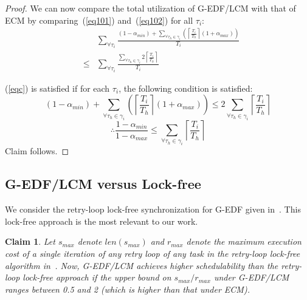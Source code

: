 \documentclass[a4paper,english]{article}
\newtheorem{clm}{Claim}
\newtheorem{proof}{Proof}
\begin{document}
\begin{proof}
We can now compare the total utilization of G-EDF/LCM with that of ECM by comparing~(\ref{eq101}) and~(\ref{eq102}) for all $\tau_i$:
\begin{eqnarray}
& & \sum_{\forall \tau_{i}}\frac{(1-\alpha_{min})+\sum_{\forall \tau_{h}\in\gamma_{i}}\left(\left\lceil\frac{T_{i}}{T_{h}}\right\rceil(1+\alpha_{max})\right)}{T_{i}} \nonumber\\
& \le &   \sum_{\forall \tau_{i}}\frac{\sum_{\forall \tau_{h}\in\gamma_{i}}2\left\lceil\frac{T_{i}}{T_{h}}\right\rceil}{T_{i}}\label{eqc}\end{eqnarray}

(\ref{eqc}) is satisfied if for each $\tau_{i}$, the following condition is satisfied:
\begin{equation*}
(1-\alpha_{min})+\sum_{\forall \tau_h \in \gamma_i}\left(\left\lceil\frac{T_{i}}{T_{h}}\right\rceil(1+\alpha_{max})\right)  \le  2\sum_{\forall \tau_h \in \gamma_i}\left\lceil\frac{T_{i}}{T_{h}}\right\rceil
\end{equation*}
\begin{equation*}
\therefore\frac{1-\alpha_{min}}{1-\alpha_{max}}  \le  \sum_{\forall \tau_h \in \gamma_i}\left\lceil\frac{T_{i}}{T_{h}}\right\rceil
\end{equation*}
Claim follows.
\end{proof}


\subsection{G-EDF/LCM versus Lock-free}
\label{gedf-lcm-lock-free}
We consider the retry-loop lock-free synchronization for G-EDF given in~\cite{key-5}. This lock-free approach is the most relevant to our work. 

\begin{clm}\label{gedf-lcm-lock-free_clm} 
Let $s_{max}$ denote $len(s_{max})$ and $r_{max}$ denote the maximum execution cost of a single iteration of any retry loop of any task in the retry-loop lock-free algorithm in~\cite{key-5}. Now, G-EDF/LCM achieves higher schedulability than the retry-loop lock-free approach if the upper bound on $s_{max}/r_{max}$ under G-EDF/LCM ranges between 0.5 and 2 (which is higher than that under  ECM). 
\end{clm}
\end{document}
